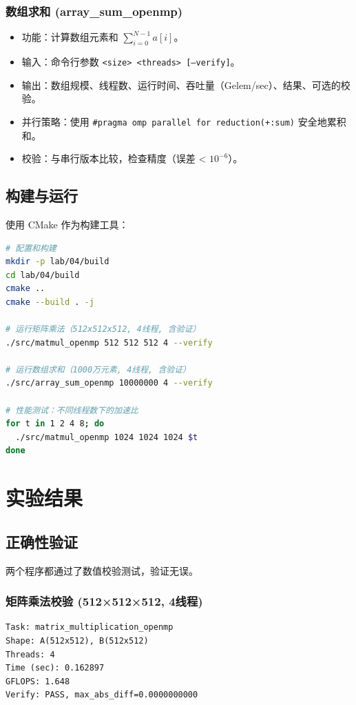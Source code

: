 \documentclass[12pt,a4paper]{ctexart}
\begin{document}
\subsubsection{数组求和 (array\_sum\_openmp)}
\begin{itemize}
  \item 功能：计算数组元素和 $\sum_{i=0}^{N-1} a[i]$。
  \item 输入：命令行参数 \texttt{<size> <threads> [--verify]}。
  \item 输出：数组规模、线程数、运行时间、吞吐量（Gelem/sec）、结果、可选的校验。
  \item 并行策略：使用 \texttt{\#pragma omp parallel for reduction(+:sum)} 安全地累积和。
  \item 校验：与串行版本比较，检查精度（误差 < $10^{-6}$）。
\end{itemize}

\subsection{构建与运行}
使用 CMake 作为构建工具：

\begin{lstlisting}[language=bash]
# 配置和构建
mkdir -p lab/04/build
cd lab/04/build
cmake ..
cmake --build . -j

# 运行矩阵乘法（512x512x512, 4线程, 含验证）
./src/matmul_openmp 512 512 512 4 --verify

# 运行数组求和（1000万元素, 4线程, 含验证）
./src/array_sum_openmp 10000000 4 --verify

# 性能测试：不同线程数下的加速比
for t in 1 2 4 8; do
  ./src/matmul_openmp 1024 1024 1024 $t
done
\end{lstlisting}

\section{实验结果}

\subsection{正确性验证}
两个程序都通过了数值校验测试，验证无误。

\subsubsection{矩阵乘法校验 (512×512×512, 4线程)}
\begin{lstlisting}
Task: matrix_multiplication_openmp
Shape: A(512x512), B(512x512)
Threads: 4
Time (sec): 0.162897
GFLOPS: 1.648
Verify: PASS, max_abs_diff=0.0000000000
\end{lstlisting}
\end{document}
